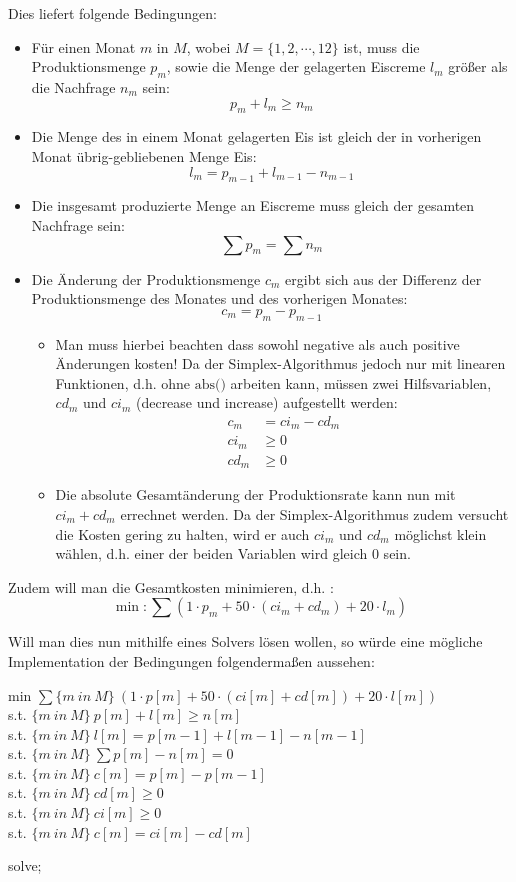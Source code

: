 Dies liefert folgende Bedingungen:
\begin{itemize}
\item Für einen Monat $m$ in $M$, wobei $M = \{1, 2, \cdots, 12\}$ ist, muss die Produktionsmenge $p_m$, sowie die Menge der gelagerten Eiscreme $l_m$ größer als die Nachfrage $n_m$ sein:
\[ p_m + l_m \geq n_m \]
\item Die Menge des in einem Monat gelagerten Eis ist gleich der in vorherigen Monat übrig-gebliebenen Menge Eis:
\[ l_m = p_{m-1} + l_{m-1} - n_{m-1} \]
\item Die insgesamt produzierte Menge an Eiscreme muss gleich der gesamten Nachfrage sein:
\[ \sum p_m = \sum n_m \]
\item Die Änderung der Produktionsmenge $c_m$ ergibt sich aus der Differenz der Produktionsmenge des Monates und des vorherigen Monates: 
\[ c_m = p_{m} - p_{m-1} \] 
	\begin{itemize}
	\item Man muss hierbei beachten dass sowohl negative als auch positive Änderungen kosten! Da der Simplex-Algorithmus jedoch nur mit linearen Funktionen, d.h. ohne $\text{abs()}$ arbeiten kann, müssen zwei Hilfsvariablen, $cd_m$ und $ci_m$ (decrease und increase) aufgestellt werden:
	\begin{align*}
	c_m &= ci_m - cd_m \\
	ci_m &\geq 0		\\
	cd_m &\geq 0
	\end{align*}
	
	\item Die absolute Gesamtänderung der Produktionsrate kann nun mit $ci_m + cd_m$ errechnet werden. Da der Simplex-Algorithmus zudem versucht die Kosten gering zu halten, wird er auch $ci_m$ und $cd_m$ möglichst klein wählen, d.h. einer der beiden Variablen wird gleich 0 sein.
 	\end{itemize}
\end{itemize}

Zudem will man die Gesamtkosten minimieren, d.h. :
\[ \min: \sum (1 \cdot p_m + 50 \cdot (ci_m + cd_m) + 20 \cdot l_m)\]

Will man dies nun mithilfe eines Solvers lösen wollen, so würde eine mögliche Implementation der Bedingungen folgendermaßen aussehen:
\newline

min $\sum\{m~in~M\} ~ (1 \cdot p[m] + 50 \cdot (ci[m] + cd[m]) + 20 \cdot l[m])$ \\
s.t. $\{m~in~M\} ~ p[m] + l[m] \geq n[m]$ \\
s.t. $\{m~in~M\} ~ l[m] = p[m - 1] + l[m - 1] - n[m - 1]$ \\
s.t. $\{m~in~M\} ~ \sum p[m] - n[m] = 0$ 	\\
s.t. $\{m~in~M\} ~ c[m] = p[m] - p[m-1]$ 	\\
s.t. $\{m~in~M\} ~ cd[m] \geq 0$			\\
s.t. $\{m~in~M\} ~ ci[m] \geq 0$			\\
s.t. $\{m~in~M\} ~ c[m] = ci[m] - cd[m]$	
\newline

solve;